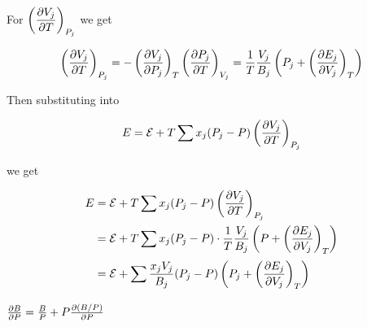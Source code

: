 \documentclass[10pt]{scrartcl}
\begin{document}
	For $\displaystyle\left( \frac{\partial V_j}{\partial T} \right)_{P_j}$ we get
	
	\begin{equation}
		\displaystyle\left( \frac{\partial V_j}{\partial T} \right)_{P_j} = -\displaystyle\left( \frac{\partial V_j}{\partial P_j} \right)_T\displaystyle\left( \frac{\partial P_j}{\partial T} \right)_{V_j} = \frac{1}{T}\frac{V_j}{B_j}\displaystyle\left( P_j + \displaystyle\left( \frac{\partial E_j}{\partial V_j} \right)_T \right)
	\end{equation}

	Then substituting into
	
	\begin{equation}
		E = \mc{E} + T\sum x_j(P_j - P)\cpd{V_j}{T}_{P_j}
	\end{equation}

	we get
		
	\begin{align*}
		E
		& = \mc{E} + T\sum x_j(P_j - P)\cpd{V_j}{T}_{P_j} \\
		& = \mc{E} + T\sum x_j(P_j - P) \cdot \frac{1}{T}\frac{V_j}{B_j}\paren{P + \cpd{E_j}{V_j}_T} \\
		& = \mc{E} + \sum \frac{x_jV_j}{B_j}(P_j - P)\paren{P_j + \cpd{E_j}{V_j}_T} \\
	\end{align*}


	
	
	$\frac{\partial B}{\partial P} = \frac{B}{P} + P\frac{\partial (B / P)}{\partial P}$
\end{document}
